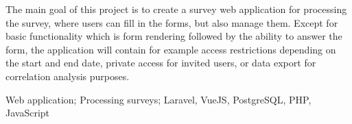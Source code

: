 
\noindent
The main goal of this project is to create a survey web application for processing the survey, where users can fill in the forms, but also manage them. Except for basic functionality which is form rendering followed by the ability to answer the form, the application will contain for example access restrictions depending on the start and end date, private access for invited users, or data export for correlation analysis purposes.

\vspace{18pt}


\noindent Web application; Processing surveys; Laravel, VueJS, PostgreSQL, PHP, JavaScript

\cleardoublepage

\tableofcontents

\cleardoublepage